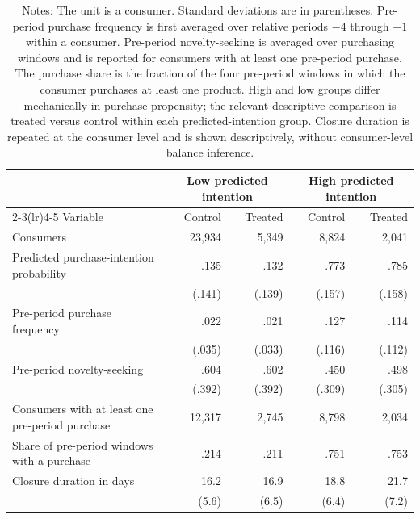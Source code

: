 \documentclass[11 pt]{article}
\newcommand\fnote[1]{\captionsetup{font=footnotesize}\caption*{#1}}
\begin{document}
\begin{table}[h!]
\centering
\caption{Four-cell descriptive statistics before closure}
\label{tab:treatment_control_balance}
\small
\begin{tabular}{lrrrr}
\toprule
& \multicolumn{2}{c}{Low predicted intention} & \multicolumn{2}{c}{High predicted intention} \\
\cmidrule(lr){2-3}\cmidrule(lr){4-5}
Variable & Control & Treated & Control & Treated \\
\midrule
Consumers & 23,934 & 5,349 & 8,824 & 2,041 \\
Predicted purchase-intention probability & .135 & .132 & .773 & .785 \\
& (.141) & (.139) & (.157) & (.158) \\
Pre-period purchase frequency & .022 & .021 & .127 & .114 \\
& (.035) & (.033) & (.116) & (.112) \\
Pre-period novelty-seeking & .604 & .602 & .450 & .498 \\
& (.392) & (.392) & (.309) & (.305) \\
Consumers with at least one pre-period purchase & 12,317 & 2,745 & 8,798 & 2,034 \\
Share of pre-period windows with a purchase & .214 & .211 & .751 & .753 \\
Closure duration in days & 16.2 & 16.9 & 18.8 & 21.7 \\
& (5.6) & (6.5) & (6.4) & (7.2) \\
\bottomrule
\end{tabular}
\vspace{1mm}
\fnote{Notes: The unit is a consumer. Standard deviations are in parentheses. Pre-period purchase frequency is first averaged over relative periods $-4$ through $-1$ within a consumer. Pre-period novelty-seeking is averaged over purchasing windows and is reported for consumers with at least one pre-period purchase. The purchase share is the fraction of the four pre-period windows in which the consumer purchases at least one product. High and low groups differ mechanically in purchase propensity; the relevant descriptive comparison is treated versus control within each predicted-intention group. Closure duration is repeated at the consumer level and is shown descriptively, without consumer-level balance inference.}
\end{table}
\end{document}
